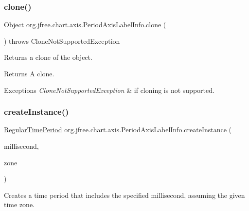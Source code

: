 \subsubsection{\texorpdfstring{clone()}{clone()}}
{\footnotesize\ttfamily Object org.\+jfree.\+chart.\+axis.\+Period\+Axis\+Label\+Info.\+clone (\begin{DoxyParamCaption}{ }\end{DoxyParamCaption}) throws Clone\+Not\+Supported\+Exception}

Returns a clone of the object.

\begin{DoxyReturn}{Returns}
A clone.
\end{DoxyReturn}

\begin{DoxyExceptions}{Exceptions}
{\em Clone\+Not\+Supported\+Exception} & if cloning is not supported. \\
\hline
\end{DoxyExceptions}
\mbox{\label{classorg_1_1jfree_1_1chart_1_1axis_1_1_period_axis_label_info_aa9717dec9050479aafac980b803a3e4f}} 
\subsubsection{\texorpdfstring{create\+Instance()}{createInstance()}\hspace{0.1cm}{\footnotesize\ttfamily [1/2]}}
{\footnotesize\ttfamily \mbox{\hyperlink{classorg_1_1jfree_1_1data_1_1time_1_1_regular_time_period}{Regular\+Time\+Period}} org.\+jfree.\+chart.\+axis.\+Period\+Axis\+Label\+Info.\+create\+Instance (\begin{DoxyParamCaption}\item[{Date}]{millisecond,  }\item[{Time\+Zone}]{zone }\end{DoxyParamCaption})}

Creates a time period that includes the specified millisecond, assuming the given time zone.


